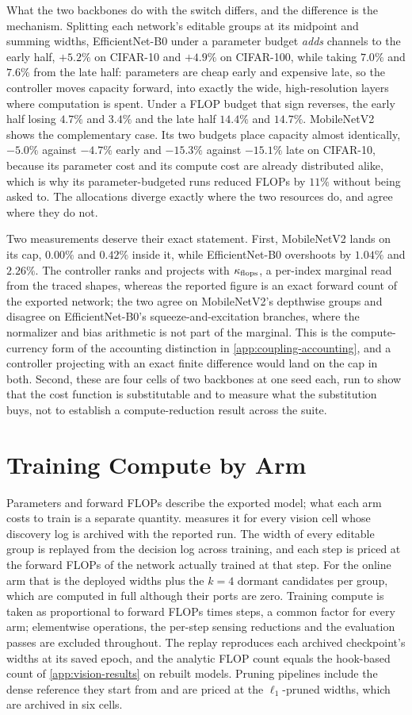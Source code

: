 \documentclass[10pt]{article}
\theoremstyle{paper}
\begin{document}
What the two backbones do with the switch differs, and the difference is the mechanism. Splitting each network's editable groups at its midpoint and summing widths, EfficientNet-B0 under a parameter budget \emph{adds} channels to the early half, $+5.2\%$ on CIFAR-10 and $+4.9\%$ on CIFAR-100, while taking $7.0\%$ and $7.6\%$ from the late half: parameters are cheap early and expensive late, so the controller moves capacity forward, into exactly the wide, high-resolution layers where computation is spent. Under a FLOP budget that sign reverses, the early half losing $4.7\%$ and $3.4\%$ and the late half $14.4\%$ and $14.7\%$. MobileNetV2 shows the complementary case. Its two budgets place capacity almost identically, $-5.0\%$ against $-4.7\%$ early and $-15.3\%$ against $-15.1\%$ late on CIFAR-10, because its parameter cost and its compute cost are already distributed alike, which is why its parameter-budgeted runs reduced FLOPs by $11\%$ without being asked to. The allocations diverge exactly where the two resources do, and agree where they do not.

Two measurements deserve their exact statement. First, MobileNetV2 lands on its cap, $0.00\%$ and $0.42\%$ inside it, while EfficientNet-B0 overshoots by $1.04\%$ and $2.26\%$. The controller ranks and projects with $\kappa_{\rm flops}$, a per-index marginal read from the traced shapes, whereas the reported figure is an exact forward count of the exported network; the two agree on MobileNetV2's depthwise groups and disagree on EfficientNet-B0's squeeze-and-excitation branches, where the normalizer and bias arithmetic is not part of the marginal. This is the compute-currency form of the accounting distinction in \cref{app:coupling-accounting}, and a controller projecting with an exact finite difference would land on the cap in both. Second, these are four cells of two backbones at one seed each, run to show that the cost function is substitutable and to measure what the substitution buys, not to establish a compute-reduction result across the suite.
\section{Training Compute by Arm}
\label{app:compute}
Parameters and forward FLOPs describe the exported model; what each arm costs to train is a
separate quantity.  measures it for every vision cell whose discovery log is
archived with the reported run. The width of every editable group is replayed from the decision
log across training, and each step is priced at the forward FLOPs of the network actually trained
at that step. For the online arm that is the deployed widths plus the $k=4$ dormant candidates per
group, which are computed in full although their ports are zero. Training compute is taken as
proportional to forward FLOPs times steps, a common factor for every arm; elementwise operations,
the per-step sensing reductions and the evaluation passes are excluded throughout. The replay
reproduces each archived checkpoint's widths at its saved epoch, and the analytic FLOP count equals
the hook-based count of \cref{app:vision-results} on rebuilt models. Pruning pipelines include the
dense reference they start from and are priced at the $\ell_1$-pruned widths, which are archived in
six cells.
\end{document}
